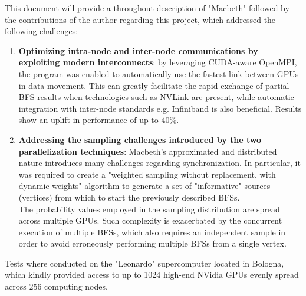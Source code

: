 This document will provide a throughout description of "Macbeth" followed by the contributions of the author regarding this project, which addressed the following challenges:
\begin{enumerate}
	\item \textbf{Optimizing intra-node and inter-node communications by exploiting modern interconnects}: 
	by leveraging CUDA-aware OpenMPI, the program was enabled to automatically use the fastest link between GPUs in data movement. This can greatly facilitate the rapid exchange of partial BFS results when technologies such as NVLink are present, while automatic integration with inter-node standards e.g. Infiniband is also beneficial. Results show an uplift in performance of up to 40\%. 
	\item \textbf{Addressing the sampling challenges introduced by the two parallelization techniques}:
	Macbeth's approximated and distributed nature introduces many challenges regarding synchronization. In particular, it was required to create a "weighted sampling without replacement, with dynamic weights" algorithm to generate a set of "informative" sources (vertices) from which to start the previously described BFSs.\\
	The probability values employed in the sampling distribution are spread across multiple GPUs. Such complexity is exacerbated by the concurrent execution of multiple BFSs, which also requires an independent sample in order to avoid erroneously performing multiple BFSs from a single vertex.
	
\end{enumerate}

Tests where conducted on the "Leonardo" supercomputer located in Bologna, which kindly provided access to up to 1024 high-end NVidia GPUs evenly spread across 256 computing nodes. 